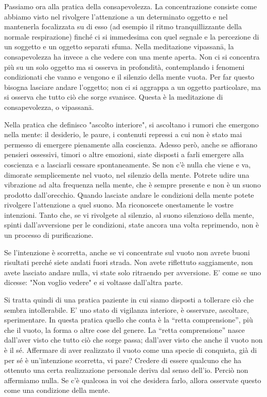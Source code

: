 
Passiamo ora alla pratica della consapevolezza. La concentrazione
consiste come abbiamo visto nel rivolgere l'attenzione a un determinato
oggetto e nel mantenerla focalizzata su di esso (ad esempio il ritmo
tranquillizzante della normale respirazione) finché ci si immedesima con
quel segnale e la percezione di un soggetto e un oggetto separati sfuma.
Nella meditazione vipassanā, la consapevolezza ha invece a che vedere
con una mente aperta. Non ci si concentra più su un solo oggetto ma si
osserva in profondità, contemplando i fenomeni condizionati che vanno e
vengono e il silenzio della mente vuota. Per far questo bisogna lasciare
andare l'oggetto; non ci si aggrappa a un oggetto particolare, ma si
osserva che tutto ciò che sorge svanisce. Questa è la meditazione di
consapevolezza, o vipassanā.

Nella pratica che definisco "ascolto interiore", si ascoltano i rumori
che emergono nella mente: il desiderio, le paure, i contenuti repressi a
cui non è stato mai permesso di emergere pienamente alla coscienza.
Adesso però, anche se affiorano pensieri ossessivi, timori o altre
emozioni, siate disposti a farli emergere alla coscienza e a lasciarli
cessare spontaneamente. Se non c'è nulla che viene e va, dimorate
semplicemente nel vuoto, nel silenzio della mente. Potrete udire una
vibrazione ad alta frequenza nella mente, che è sempre presente e non è
un suono prodotto dall'orecchio. Quando lasciate andare le condizioni
della mente potete rivolgere l'attenzione a quel suono. Ma riconoscete
onestamente le vostre intenzioni. Tanto che, se vi rivolgete al
silenzio, al suono silenzioso della mente, spinti dall'avversione per le
condizioni, state ancora una volta reprimendo, non è un processo di
purificazione.

Se l'intenzione è scorretta, anche se vi concentrate sul vuoto non
avrete buoni risultati perché siete andati fuori strada. Non avete
riflettuto saggiamente, non avete lasciato andare nulla, vi state solo
ritraendo per avversione. E' come se uno dicesse: "Non voglio vedere" e
si voltasse dall'altra parte.

Si tratta quindi di una pratica paziente in cui siamo disposti a
tollerare ciò che sembra intollerabile. E' uno stato di vigilanza
interiore, è osservare, ascoltare, sperimentare. In questa pratica
quello che conta è la “retta comprensione”, più che il vuoto, la forma o
altre cose del genere. La “retta comprensione” nasce dall'aver visto che
tutto ciò che sorge passa; dall'aver visto che anche il vuoto non è il
sé. Affermare di aver realizzato il vuoto come una specie di conquista,
già di per sé è un'intenzione scorretta, vi pare? Credere di essere
qualcuno che ha ottenuto una certa realizzazione personale deriva dal
senso dell'io. Perciò non affermiamo nulla. Se c'è qualcosa in voi che
desidera farlo, allora osservate questo come una condizione della mente.

